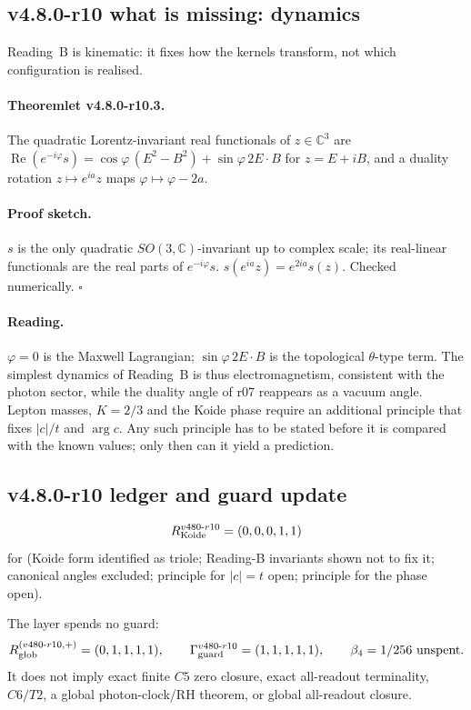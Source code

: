 \subsection*{v4.8.0-r10 what is missing: dynamics}
\label{subsec:v480-r10-dynamics}

Reading~B is kinematic: it fixes how the kernels transform, not which configuration is realised.

\paragraph{Theoremlet v4.8.0-r10.3.}
The quadratic Lorentz-invariant real functionals of \(z\in\mathbb C^3\) are
\(\operatorname{Re}(e^{-i\varphi}s)=\cos\varphi\,(E^2-B^2)+\sin\varphi\,2E\cdot B\) for \(z=E+iB\), and a
duality rotation \(z\mapsto e^{ia}z\) maps \(\varphi\mapsto\varphi-2a\).

\paragraph{Proof sketch.}
\(s\) is the only quadratic \(SO(3,\mathbb C)\)-invariant up to complex scale; its real-linear functionals
are the real parts of \(e^{-i\varphi}s\).  \(s(e^{ia}z)=e^{2ia}s(z)\).  Checked numerically.  \(\square\)

\paragraph{Reading.}
\(\varphi=0\) is the Maxwell Lagrangian; \(\sin\varphi\,2E\cdot B\) is the topological \(\theta\)-type term.
The simplest dynamics of Reading~B is thus electromagnetism, consistent with the photon sector, while the
duality angle of r07 reappears as a vacuum angle.  Lepton masses, \(K=2/3\) and the Koide phase require an
additional principle that fixes \(|c|/t\) and \(\arg c\).  Any such principle has to be stated before it is
compared with the known values; only then can it yield a prediction.

\subsection*{v4.8.0-r10 ledger and guard update}
\label{subsec:v480-r10-ledger-guard}

\[
R_{\rm Koide}^{v480\text{-}r10}=(0,0,0,1,1)
\]
for (Koide form identified as triole; Reading-B invariants shown not to fix it; canonical angles excluded;
principle for \(|c|=t\) open; principle for the phase open).

The layer spends no guard:
\[
R_{\rm glob}^{(v480\text{-}r10,+)}=(0,1,1,1,1),
\qquad
\Gamma_{\rm guard}^{v480\text{-}r10}=(1,1,1,1,1),
\qquad
\beta_4=1/256\ \text{unspent}.
\]
It does not imply exact finite \(C5\) zero closure, exact all-readout terminality,
\(C6/T2\), a global photon-clock/RH theorem, or global all-readout closure.

